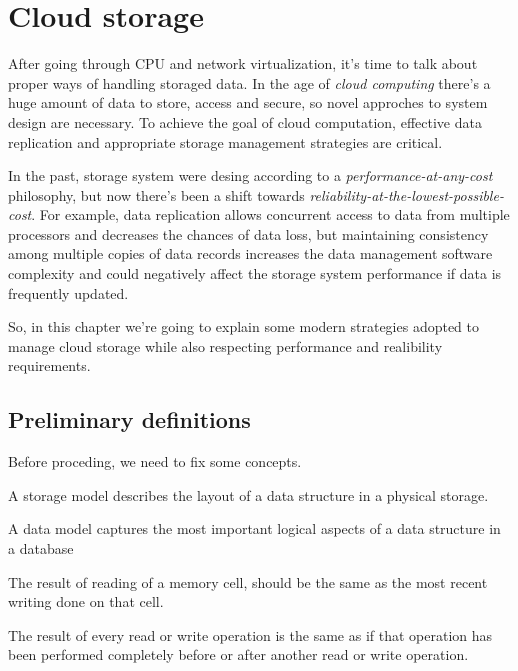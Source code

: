 \chapter{Cloud storage}
After going through CPU and network virtualization, it's time to talk about
proper ways of handling storaged data. In the age of \emph{cloud computing}
there's a huge amount of data to store, access and secure, so novel approches
to system design are necessary. To achieve the goal of cloud computation,
effective data replication and appropriate storage management strategies are
critical.

In the past, storage system were desing according to a
\emph{performance-at-any-cost} philosophy, but now there's been a shift towards
\emph{reliability-at-the-lowest-possible-cost}. For example, data replication
allows concurrent access to data from multiple processors and decreases the
chances of data loss, but maintaining consistency among multiple copies of data
records increases the data management software complexity and could negatively
affect the storage system performance if data is frequently updated.

So, in this chapter we're going to explain some modern strategies adopted
to manage cloud storage while also respecting performance and realibility
requirements.

\section{Preliminary definitions}
Before proceding, we need to fix some concepts.

\begin{definition}
    A storage model describes the layout of a data structure in a physical storage.
\end{definition}
\begin{definition}
    A data model captures the most important logical aspects of a data structure
    in a database
\end{definition}

\begin{definition}
    The result of reading of a memory cell, should be the same as the most recent
    writing done on that cell.
\end{definition}
\begin{definition}
    The result of every read or write operation is the same as if that
    operation has been performed completely before or after another read or
    write operation.
\end{definition}

